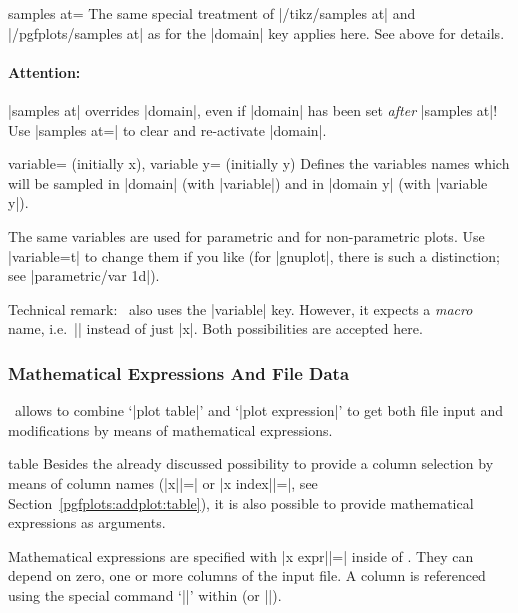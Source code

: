 {\begin{pgfplotskey}{samples at=}
	The same special treatment of |/tikz/samples at| and |/pgfplots/samples at| as for the |domain| key applies here. See above for details.

	\paragraph{Attention:} |samples at| overrides |domain|, even if |domain| has been set \emph{after} |samples at|! Use |samples at={}| to clear  and re-activate |domain|.
\end{pgfplotskey}

\begin{pgfplotskeylist}{%
	variable= (initially x),%
	variable y= (initially y)}
	Defines the variables names which will be sampled in |domain| (with |variable|) and in |domain y| (with |variable y|).

	The same variables are used for parametric and for non-parametric plots. Use |variable=t| to change them if you like (for |gnuplot|, there is such a distinction; see |parametric/var 1d|).

	Technical remark: \Tikz\ also uses the |variable| key. However, it expects a \emph{macro} name, i.e.\ |\x| instead of just |x|. Both possibilities are accepted here.
\end{pgfplotskeylist}

\subsubsection{Mathematical Expressions And File Data}
\PGFPlots\ allows to combine `|plot table|' and `|plot expression|' to get both file input and modifications by means of mathematical expressions.

\begin{addplotoperation}[]{table}{}
\label{pgfplots:addplot:table:expr}
	Besides the already discussed possibility to provide a column selection by means of column names (|x||=| or |x index||=|, see Section~\ref{pgfplots:addplot:table}), it is also possible to provide mathematical expressions as arguments.

	Mathematical expressions are specified with |x expr||=| inside of . They can depend on zero, one or more columns of the input file. A column is referenced using the special command `|\thisrow|' within  (or |\thisrowno|).


\end{addplotoperation}}
